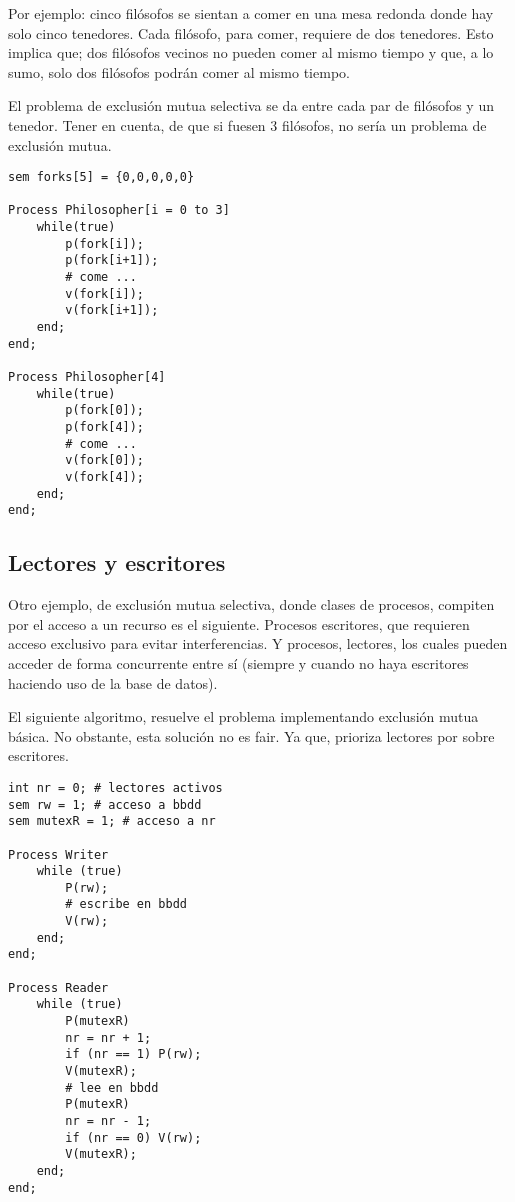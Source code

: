 \documentclass[a4paper, 11pt]{book}
\begin{document}
Por ejemplo: cinco filósofos se sientan a comer en una mesa redonda donde hay solo cinco tenedores. Cada filósofo, para comer, requiere de dos tenedores. Esto implica que; dos filósofos vecinos no pueden comer al mismo tiempo y que, a lo sumo, solo dos filósofos podrán comer al mismo tiempo.

El problema de exclusión mutua selectiva se da entre cada par de filósofos y un tenedor. Tener en cuenta, de que si fuesen 3 filósofos, no sería un problema de exclusión mutua.


\begin{lstlisting}
sem forks[5] = {0,0,0,0,0}

Process Philosopher[i = 0 to 3]
    while(true)
        p(fork[i]);
        p(fork[i+1]);
        # come ...
        v(fork[i]); 
        v(fork[i+1]);
    end;
end;

Process Philosopher[4]
    while(true)
        p(fork[0]);
        p(fork[4]);
        # come ...
        v(fork[0]); 
        v(fork[4]);
    end;
end;
\end{lstlisting}

\subsection{Lectores y escritores}

Otro ejemplo, de exclusión mutua selectiva, donde clases de procesos, compiten por el acceso a un recurso es el siguiente. Procesos escritores, que requieren acceso exclusivo para evitar interferencias. Y procesos, lectores, los cuales pueden acceder de forma concurrente entre sí (siempre y cuando no haya escritores haciendo uso de la base de datos).

El siguiente algoritmo, resuelve el problema implementando exclusión mutua básica. No obstante, esta solución no es fair. Ya que, prioriza lectores por sobre escritores.

\begin{lstlisting}
int nr = 0; # lectores activos
sem rw = 1; # acceso a bbdd
sem mutexR = 1; # acceso a nr

Process Writer
    while (true)
        P(rw);
        # escribe en bbdd
        V(rw);
    end;
end;

Process Reader
    while (true)
        P(mutexR)
        nr = nr + 1;
        if (nr == 1) P(rw);
        V(mutexR);
        # lee en bbdd
        P(mutexR)
        nr = nr - 1;
        if (nr == 0) V(rw);
        V(mutexR);
    end;
end;
\end{lstlisting}
\end{document}
